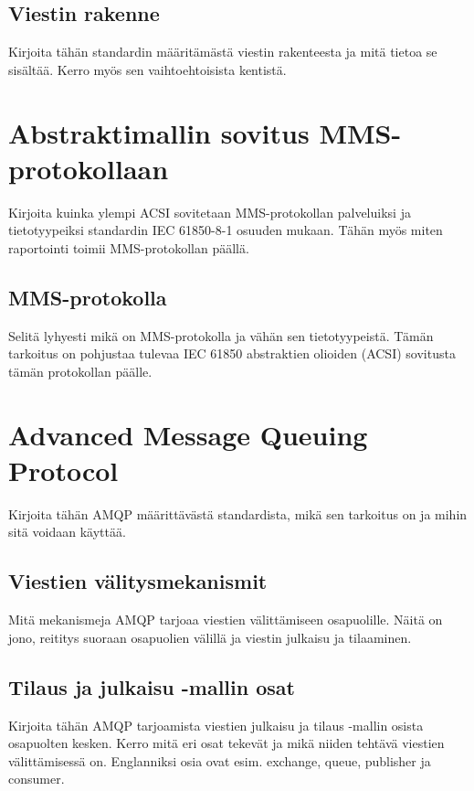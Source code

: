 \subsection{Viestin rakenne}
\begin{it}
	Kirjoita tähän standardin määritämästä viestin rakenteesta ja mitä tietoa se sisältää. Kerro myös sen vaihtoehtoisista kentistä.
\end{it}

\section{Abstraktimallin sovitus MMS-protokollaan}
\begin{it}
	Kirjoita kuinka ylempi ACSI sovitetaan MMS-protokollan palveluiksi ja tietotyypeiksi standardin IEC 61850-8-1 osuuden mukaan. Tähän myös miten raportointi toimii MMS-protokollan päällä.
\end{it}

\subsection{MMS-protokolla}
\begin{it}
	Selitä lyhyesti mikä on MMS-protokolla ja vähän sen tietotyypeistä. Tämän tarkoitus on pohjustaa tulevaa IEC 61850 abstraktien olioiden (ACSI) sovitusta tämän protokollan päälle.
\end{it}

\section{Advanced Message Queuing Protocol}
\begin{it}
	Kirjoita tähän AMQP määrittävästä standardista, mikä sen tarkoitus on ja mihin sitä voidaan käyttää.
\end{it}

\subsection{Viestien välitysmekanismit}
\begin{it}
	Mitä mekanismeja AMQP tarjoaa viestien välittämiseen osapuolille. Näitä on jono, reititys suoraan osapuolien välillä ja viestin julkaisu ja tilaaminen.
\end{it}

\subsection{Tilaus ja julkaisu -mallin osat}
\begin{it}
	Kirjoita tähän AMQP tarjoamista viestien julkaisu ja tilaus -mallin osista osapuolten kesken. Kerro mitä eri osat tekevät ja mikä niiden tehtävä viestien välittämisessä on. Englanniksi osia ovat esim. exchange, queue, publisher ja consumer.
\end{it}
